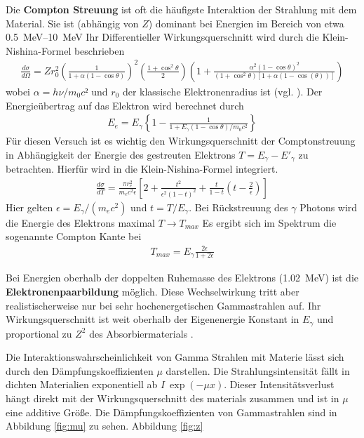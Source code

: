 Die \textbf{Compton Streuung} ist oft die häufigste Interaktion der Strahlung mit dem Material.
Sie ist (abhängig von $Z$) dominant bei Energien im Bereich von etwa \qtyrange{0.5}{10}{\MeV}
Ihr Differentieller Wirkungsquerschnitt wird durch die Klein-Nishina-Formel beschrieben
\begin{align} 
    \frac{d\sigma}{d \Omega} = Z r_0^2 \left(\frac{1}{1+\alpha(1-\cos\theta)}\right)^2 %
    \left(\frac{1+ \cos^2\theta}{2}\right)%
    \left(1+ \frac{\alpha^2(1-\cos \theta)^2}{(1+\cos^2 \theta)[1+\alpha(1-\cos(\theta))]}\right)
    \label{eq:wq_compton}
\end{align}%
wobei $\alpha = h \nu / m_0 c²$ und $r_0$ der klassische Elektronenradius ist (vgl. \cite{book:knoll}).%
Der Energieübertrag auf das Elektron wird berechnet durch
\begin{align}
    E_{e} = E_{\gamma} \left\{1- \frac{1}{1+ E_{\gamma}(1-\cos\theta)/m_0 c^2} \right\}
    \label{eq:ecompton}
\end{align} 
Für diesen Versuch ist es wichtig den Wirkungsquerschnitt der Comptonstreuung in Abhängigkeit der
Energie des gestreuten Elektrons $T = E_{\gamma} - E'_{\gamma}$ zu betrachten.
Hierfür wird in \cite[][Kap. 3.5.3]{book:kolano} die Klein-Nishina-Formel integriert.
\begin{align}
    \frac{d \sigma}{d T} =  \frac{\pi r_{e}^{2}}{m_e c^2 \epsilon}%
    \left[2 + \frac{t^2}{\epsilon^2(1-t)^2} + \frac{t}{1-t} %
    \left(t - \frac{2}{\epsilon} \right) \right]
\end{align}
Hier gelten $\epsilon = E_{\gamma} / (m_e c^2)$ und $t = T/ E_\gamma$.
Bei Rückstreuung des $\gamma$ Photons wird die Energie des Elektrons maximal
$T \rightarrow T_{max}$ 
Es ergibt sich im Spektrum die sogenannte Compton Kante bei
\begin{align}
    T_{max}= E_\gamma \frac{2\epsilon}{1+2\epsilon}
\end{align}


Bei Energien oberhalb der doppelten Ruhemasse des Elektrons 
(\qty{1.02}{\MeV}) ist die \textbf{Elektronenpaarbildung} möglich.
Diese Wechselwirkung tritt aber realistischerweise nur bei sehr 
hochenergetischen Gammastrahlen auf.
Ihr Wirkungsquerschnitt ist  weit oberhalb der Eigenenergie Konstant 
in $E_\gamma$ und proportional zu $Z^2$ des Absorbiermaterials \cite[vgl.][Kap 3.5.5]{book:kolano}. 

Die Interaktionswahrscheinlichkeit von Gamma Strahlen mit Materie 
lässt sich durch den Dämpfungskoeffizienten $\mu$ darstellen.
Die Strahlungsintensität fällt in dichten Materialien exponentiell ab $I ~ \exp(-\mu x)$.
Dieser Intensitätsverlust hängt direkt mit der Wirkungsquerschnitt des materials zusammen und ist in $\mu$
eine additive Größe.
Die Dämpfungskoeffizienten von Gammastrahlen sind in Abbildung \ref{fig:mu} zu sehen.
Abbildung \ref{fig:z}

